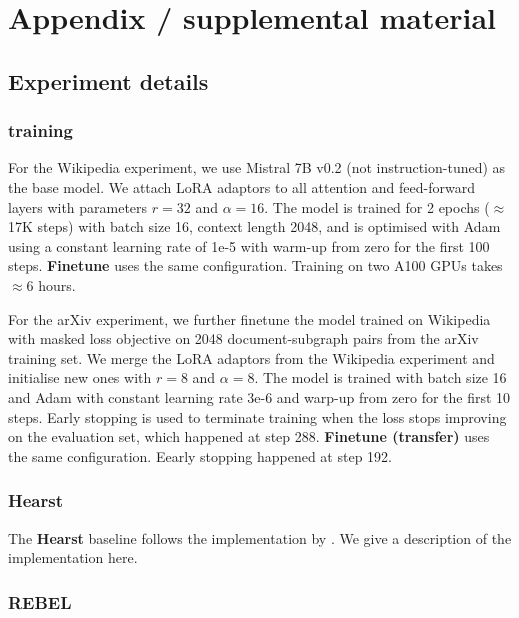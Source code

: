 \section{Appendix / supplemental material}

\subsection{Experiment details}  \label{appendix:exp-details}

\subsubsection{\name training}  \label{appendix:training-details}

For the Wikipedia experiment, we use Mistral 7B v0.2 (not instruction-tuned) \cite{jiang2023mistral} as the base model. We attach LoRA \cite{hu2021lora} adaptors to all attention and feed-forward layers with parameters $r=32$ and $\alpha=16$. The model is trained for 2 epochs ($\approx$ 17K steps) with batch size 16, context length 2048, and is optimised with Adam using a constant learning rate of 1e-5 with warm-up from zero for the first 100 steps. \textbf{Finetune} uses the same configuration. Training on two A100 GPUs takes $\approx 6$ hours.

For the arXiv experiment, we further finetune the model trained on Wikipedia with masked loss objective on 2048 document-subgraph pairs from the arXiv training set. We merge the LoRA adaptors from the Wikipedia experiment and initialise new ones with $r=8$ and $\alpha=8$. The model is trained with batch size 16 and Adam with constant learning rate 3e-6 and warp-up from zero for the first 10 steps. Early stopping is used to terminate training when the loss stops improving on the evaluation set, which happened at step 288. \textbf{Finetune (transfer)} uses the same configuration. Eearly stopping happened at step 192.

\subsubsection{Hearst}

The \textbf{Hearst} baseline follows the implementation by \citet{roller2018hearst}. We give a description of the implementation here. 

\subsubsection{REBEL}

